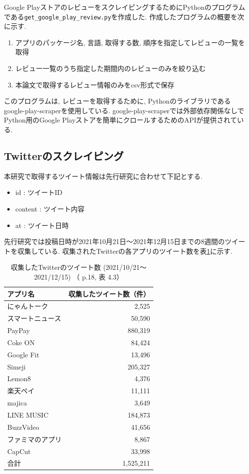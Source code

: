 Google PlayストアのレビューをスクレイピングするためにPythonのプログラムである\verb|get_google_play_review.py|を作成した. 
作成したプログラムの概要を次に示す. 

\begin{enumerate}
  \item アプリのパッケージ名, 言語, 取得する数, 順序を指定してレビューの一覧を取得
  \item レビュー一覧のうち指定した期間内のレビューのみを絞り込む
  \item 本論文で取得するレビュー情報のみをcsv形式で保存
\end{enumerate}
このプログラムは, レビューを取得するために, Pythonのライブラリであるgoogle-play-scraperを使用している. 
google-play-scraperでは外部依存関係なしでPython用のGoogle Playストアを簡単にクロールするためのAPIが提供されている\cite{google-play-scraper}. 


\subsection{Twitterのスクレイピング}
\label{sec:x}
本研究で取得するツイート情報は先行研究\cite{kawatsura}に合わせて下記とする. 
\begin{itemize}
 \item id : ツイートID
 \item content : ツイート内容
 \item at : ツイート日時
\end{itemize}

先行研究では投稿日時が2021年10月21日〜2021年12月15日までの8週間のツイートを収集している. 収集されたTwitterの各アプリのツイート数を表\ref{tb:rawtweetnum}に示す. 

\begin{table}[H]
  \caption{収集したTwitterのツイート数 (2021/10/21〜2021/12/15) （ \cite{kawatsura} p.18, 表 4.3）}
  \label{tb:rawtweetnum}
  \begin{center}
  \begin{tabular}{l|r}
    \hline
    アプリ名&収集したツイート数（件）\\\hline\hline
    にゃんトーク&2,525\\\hline
    スマートニュース&50,590\\\hline
    PayPay&880,319\\\hline
    Coke ON&84,424\\\hline
    Google Fit&13,496\\\hline
    Simeji&205,327\\\hline
    Lemon8&4,376\\\hline
    楽天ペイ&11,111\\\hline
    majica&3,649\\\hline
    LINE MUSIC&184,873\\\hline
    BuzzVideo&41,656\\\hline
    ファミマのアプリ&8,867\\\hline
    CapCut&33,998\\\hline\hline
    合計&1,525,211
  \end{tabular}\end{center}
\end{table}

